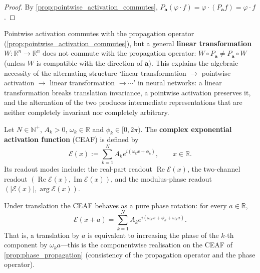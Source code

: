 \begin{proof}
By \cref{prop:pointwise_activation_commutes}, $P_{\mathbf{a}}(\varphi\cdot f) = \varphi\cdot(P_{\mathbf{a}}f) = \varphi\cdot f$.
\end{proof}

\begin{remark}\label{rem:linear_transform_breaks_translation}
Pointwise activation commutes with the propagation operator (\cref{prop:pointwise_activation_commutes}), but a general \textbf{linear transformation} $W:\mathbb{R}^n\to\mathbb{R}^n$ does not commute with the propagation operator: $W\circ P_{\mathbf{a}}\neq P_{\mathbf{a}}\circ W$ (unless $W$ is compatible with the direction of $\mathbf{a}$). This explains the algebraic necessity of the alternating structure `linear transformation $\to$ pointwise activation $\to$ linear transformation $\to\cdots$' in neural networks: a linear transformation breaks translation invariance, a pointwise activation preserves it, and the alternation of the two produces intermediate representations that are neither completely invariant nor completely arbitrary.
\end{remark}

\begin{definition}\label{def:ceaf_definition}
Let $N\in\mathbb{N}^+$, $A_k>0$, $\omega_k\in\mathbb{R}$ and $\phi_k\in[0,2\pi)$. The \textbf{complex exponential activation function} (CEAF) is defined by
\[
\mathcal{E}(x) := \sum_{k=1}^{N}A_k e^{i(\omega_k x+\phi_k)}, \qquad x\in\mathbb{R}.
\]
Its readout modes include: the real-part readout $\operatorname{Re}\mathcal{E}(x)$, the two-channel readout $(\operatorname{Re}\mathcal{E}(x),\operatorname{Im}\mathcal{E}(x))$, and the modulus-phase readout $(|\mathcal{E}(x)|, \arg\mathcal{E}(x))$.
\end{definition}

\begin{proposition}\label{prop:ceaf_phase_rotation}
Under translation the CEAF behaves as a pure phase rotation: for every $a\in\mathbb{R}$,
\[
\mathcal{E}(x+a) = \sum_{k=1}^{N}A_k e^{i(\omega_k x+\phi_k+\omega_k a)}.
\]
That is, a translation by $a$ is equivalent to increasing the phase of the $k$-th component by $\omega_k a$---this is the componentwise realisation on the CEAF of \cref{prop:phase_propagation} (consistency of the propagation operator and the phase operator).
\end{proposition}

